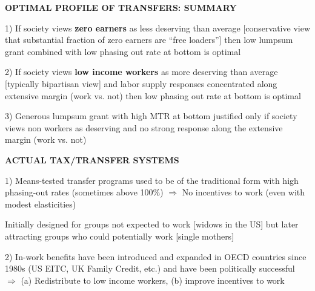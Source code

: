 \documentclass[landscape]{slides}
\begin{document}
\begin{slide}

\end{slide}

\begin{slide}
\begin{center}
{\bf OPTIMAL PROFILE OF TRANSFERS: SUMMARY}
\end{center}

1) If society views \textbf{zero earners} as less deserving than average [conservative view 
that substantial fraction of zero earners are ``free loaders''] then low lumpsum grant
combined with low phasing out rate at bottom is optimal 

2) If society views \textbf{low income workers} as more deserving than average [typically bipartisan view]
and labor supply responses concentrated along extensive margin (work vs. not) then low phasing out rate at
bottom is optimal 

3) Generous lumpsum grant with high MTR at bottom justified only if society views non workers as deserving
and no strong response along the extensive margin (work vs. not)

\end{slide}



\begin{slide}
\begin{center}
{\bf ACTUAL TAX/TRANSFER SYSTEMS}
\end{center}

1) Means-tested transfer programs used to be of the traditional form with high
phasing-out rates (sometimes above 100\%) $\Rightarrow$ No
incentives to work (even with modest elasticities)

Initially designed for
groups not expected to work [widows in the US] but later attracting
groups who could potentially work [single mothers]

2) In-work benefits have been introduced and expanded in OECD
countries since 1980s (US EITC, UK Family Credit, etc.) and have
been politically successful $\Rightarrow$ (a) Redistribute to low
income workers, (b) improve incentives to work

\end{slide}
\end{document}
